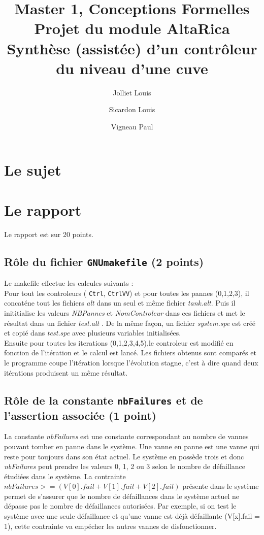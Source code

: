 \documentclass[a4paper]{book}
\newcommand{\altarica}{{\sc AltaRica}}
\begin{document}
\title{Master 1, Conceptions Formelles\\
Projet du module \altarica\\
Synthèse (assistée) d'un contrôleur du niveau d'une cuve}

\date{}

\author{Jolliet Louis \and Sicardon Louis \and Vigneau Paul}

\maketitle

\chapter{Le sujet}


\chapter{Le rapport}
Le rapport est sur 20 points.

\section{Rôle du fichier {\tt GNUmakefile} (2 points)}
Le makefile effectue les calcules suivants : \\
Pour tout les controleurs ( {\tt Ctrl}, {\tt CtrlVV}) et  pour toutes les pannes (0,1,2,3), il concaténe tout les fichiers \textit{alt} dans un seul et même fichier \textit{tank.alt}.
Puis il inititialise les valeurs \textit{NBPannes} et \textit{NomControleur} dans ces fichiers et met le résultat dans un fichier \textit{test.alt} .
De la même façon, un fichier  \textit{system.spe} est créé et copié dans  \textit{test.spe} avec plusieurs variables initialisées. \\
Ensuite pour toutes les iterations (0,1,2,3,4,5),le controleur est modifié en fonction de l'itération et le calcul est lancé.
Les fichiers obtenus sont comparés et le programme coupe l'itération lorsque l'évolution stagne, c'est à dire quand deux itérations produisent un même résultat.

\section{Rôle de la constante {\tt nbFailures} et de l'assertion associée (1 point)}
La constante \textit{nbFailures} est une constante correspondant au nombre de vannes pouvant tomber en panne dans le système. Une vanne en panne est une vanne qui reste pour toujours dans son état actuel. Le système en possède trois et donc \textit{nbFailures} peut prendre les valeurs 0, 1, 2 ou 3 selon le nombre de défaillance étudiées dans le système. La contrainte $nbFailures >= (V [0].fail + V [1].fail + V [2].fail)$ présente dans le système permet de s’assurer que le nombre de défaillances dans le système actuel ne dépasse pas le nombre de défaillances autorisées. Par exemple, si on test le système avec une seule défaillance et qu'une vanne est déjà défaillante (V[x].fail = 1), cette contrainte va empécher les autres vannes de disfonctionner. 
\end{document}

